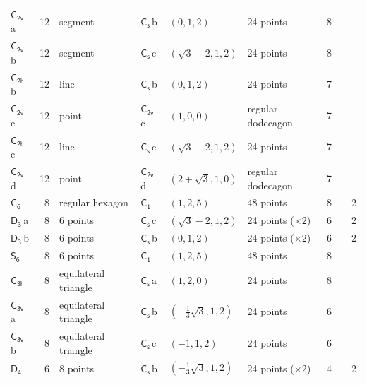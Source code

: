 \documentclass[10pt,a4paper]{article}
\numberwithin{equation}{section}
\newcommand{\grp}[1]{\mathsf{#1}}
\newcommand{\clsletter}[1]{\,{\scriptsize\color{black!55}#1}}
\newlength{\fillwidth}\newlength{\cellwidth}\newlength{\colwidth}
\begin{document}
{{\begin{longtable}{@{}lrllllr>{\RaggedRight\arraybackslash}p{\fillwidth}r@{}}
\href{C2v.pdf}{$\grp{C_{2v}}$}\clsletter{a} & 12 & segment & \href{C1v.pdf}{$\grp{C_{s}}$}\clsletter{b} & $(0, 1, 2)$ & 24 points & 8 &  & \\
\href{C2v.pdf}{$\grp{C_{2v}}$}\clsletter{b} & 12 & segment & \href{C1v.pdf}{$\grp{C_{s}}$}\clsletter{c} & $(\sqrt{3} - 2, 1, 2)$ & 24 points & 8 &  & \\
\href{C2h.pdf}{$\grp{C_{2h}}$}\clsletter{b} & 12 & line & \href{C1v.pdf}{$\grp{C_{s}}$}\clsletter{b} & $(0, 1, 2)$ & 24 points & 7 &  & \\
\href{C2v.pdf}{$\grp{C_{2v}}$}\clsletter{c} & 12 & point & \href{C2v.pdf}{$\grp{C_{2v}}$}\clsletter{c} & $(1, 0, 0)$ & regular dodecagon & 7 &  & \\
\href{C2h.pdf}{$\grp{C_{2h}}$}\clsletter{c} & 12 & line & \href{C1v.pdf}{$\grp{C_{s}}$}\clsletter{c} & $(\sqrt{3} - 2, 1, 2)$ & 24 points & 7 &  & \\
\href{C2v.pdf}{$\grp{C_{2v}}$}\clsletter{d} & 12 & point & \href{C2v.pdf}{$\grp{C_{2v}}$}\clsletter{d} & $(2 + \sqrt{3}, 1, 0)$ & regular dodecagon & 7 &  & \\
\href{C6.pdf}{$\grp{C_{6}}$} & 8 & regular hexagon & \href{C1.pdf}{$\grp{C_{1}}$} & $(1, 2, 5)$ & 48 points & 8 &  & 2\\
\href{D3.pdf}{$\grp{D_{3}}$}\clsletter{a} & 8 & 6 points & \href{C1v.pdf}{$\grp{C_{s}}$}\clsletter{c} & $(\sqrt{3} - 2, 1, 2)$ & 24 points (${\times}2$) & 6 &  & 2\\
\href{D3.pdf}{$\grp{D_{3}}$}\clsletter{b} & 8 & 6 points & \href{C1v.pdf}{$\grp{C_{s}}$}\clsletter{b} & $(0, 1, 2)$ & 24 points (${\times}2$) & 6 &  & 2\\
\href{S6.pdf}{$\grp{S_{6}}$} & 8 & 6 points & \href{C1.pdf}{$\grp{C_{1}}$} & $(1, 2, 5)$ & 48 points & 8 &  & \\
\href{C3h.pdf}{$\grp{C_{3h}}$} & 8 & equilateral triangle & \href{C1v.pdf}{$\grp{C_{s}}$}\clsletter{a} & $(1, 2, 0)$ & 24 points & 8 &  & \\
\href{C3v.pdf}{$\grp{C_{3v}}$}\clsletter{a} & 8 & equilateral triangle & \href{C1v.pdf}{$\grp{C_{s}}$}\clsletter{b} & $(-\tfrac{1}{3}\sqrt{3}, 1, 2)$ & 24 points & 6 &  & \\
\href{C3v.pdf}{$\grp{C_{3v}}$}\clsletter{b} & 8 & equilateral triangle & \href{C1v.pdf}{$\grp{C_{s}}$}\clsletter{c} & $(-1, 1, 2)$ & 24 points & 6 &  & \\
\href{D4.pdf}{$\grp{D_{4}}$} & 6 & 8 points & \href{C1v.pdf}{$\grp{C_{s}}$}\clsletter{b} & $(-\tfrac{1}{3}\sqrt{3}, 1, 2)$ & 24 points (${\times}2$) & 4 &  & 2\\

\end{longtable}}}
\end{document}
